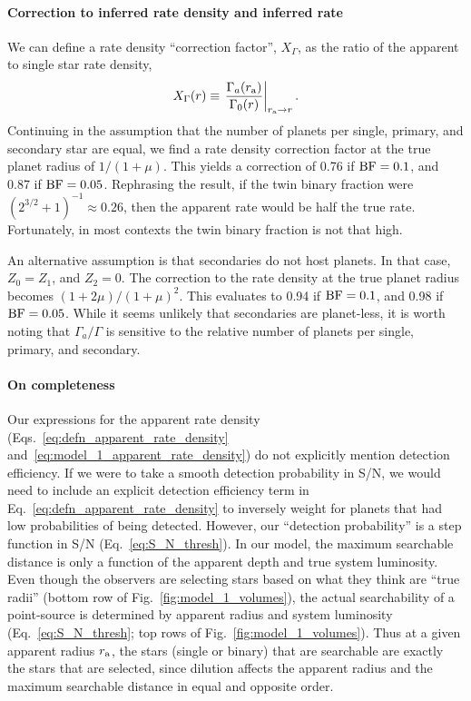 \documentclass[12pt,modern]{aastex61}
\renewcommand{\a}{_{\rm a}}
\begin{document}
\paragraph{Correction to inferred rate density and inferred rate}
We can define a rate density ``correction factor'', $X_\Gamma$, as the ratio 
of the apparent to single star rate density,
\begin{equation}
X_\Gamma(r) \equiv \left. \frac{\Gamma_a(r\a)}{\Gamma_0(r)} \right|_{r\a 
\rightarrow r}.
\end{equation}
Continuing in the assumption that the number of planets per single, primary, 
and secondary star are equal, we find a rate density 
correction factor at the true planet radius of $1/(1+\mu)$.
This yields a correction of 0.76 if ${\rm BF}=0.1$, and 0.87 if ${\rm 
BF}=0.05$. Rephrasing the result, if the twin binary fraction were 
$(2^{3/2}+1)^{-1}\approx 0.26$, then the apparent rate would be half the true 
rate. Fortunately, in most contexts the twin binary fraction is not that high.

An alternative assumption is that secondaries do not host planets. In that 
case, $Z_0=Z_1$, and $Z_2=0$. The correction to the rate density at the true 
planet radius becomes $(1+2\mu)/(1+\mu)^2$.
This evaluates to 0.94 if ${\rm BF}=0.1$, and 0.98 if ${\rm BF}=0.05$.
While it seems unlikely that secondaries are planet-less, 
it is worth noting that $\Gamma_a/\Gamma$ is sensitive to the relative number 
of planets per single, primary, and secondary.

\paragraph{On completeness}
Our expressions for the apparent rate density 
(Eqs.~\ref{eq:defn_apparent_rate_density} 
and~\ref{eq:model_1_apparent_rate_density}) do not explicitly mention 
detection efficiency.
If we were to take a smooth detection probability in S/N, we would need to 
include an explicit detection efficiency term in 
Eq.~\ref{eq:defn_apparent_rate_density} to inversely weight for planets 
that had low probabilities of being detected.
However, our ``detection probability'' is a step function in S/N 
(Eq.~\ref{eq:S_N_thresh}).
In our model, the maximum searchable distance is only a function of the 
apparent depth and true system luminosity.
Even though the observers are selecting stars based on what they think are 
``true radii'' (bottom row of Fig.~\ref{fig:model_1_volumes}), the 
actual searchability of a point-source is determined by apparent radius and 
system luminosity (Eq.~\ref{eq:S_N_thresh}; top rows of 
Fig.~\ref{fig:model_1_volumes}).
Thus at a given apparent radius $r\a$, the stars (single or binary) that are 
searchable are exactly the stars that are selected, since dilution affects the 
apparent radius and the maximum searchable distance in equal and opposite 
order.
\end{document}
